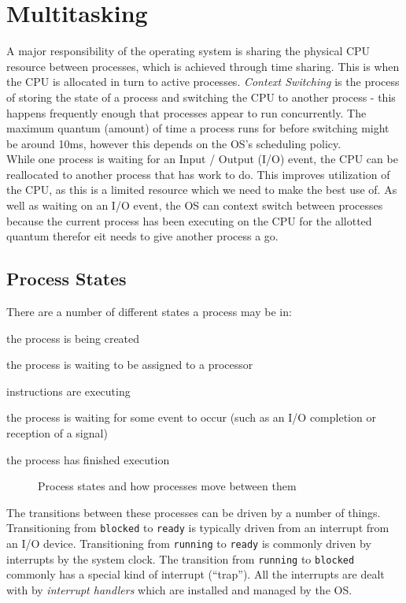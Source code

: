\section{Multitasking}
A major responsibility of the operating system is sharing the physical CPU resource between processes, which is achieved through time sharing. This is when the CPU is allocated in turn to active processes. \textit{Context Switching} is the process of storing the state of a process and switching the CPU to another process - this happens frequently enough that processes appear to run concurrently. The maximum quantum (amount) of time a process runs for before switching might be around 10ms, however this depends on the OS's scheduling policy.  \\

While one process is waiting for an Input / Output (I/O) event, the CPU can be reallocated to another process that has work to do. This improves utilization of the CPU, as this is a limited resource which we need to make the best use of. As well as waiting on an I/O event, the OS can context switch between processes because the current process has been executing on the CPU for the allotted quantum therefor eit needs to give another process a go.

\subsection{Process States}
There are a number of different states a process may be in:
\begin{description}[font=\ttfamily]
    \item[new] the process is being created
    \item[ready] the process is waiting to be assigned to a processor
    \item[running] instructions are executing
    \item[blocked / waiting] the process is waiting for some event to occur (such as an I/O completion or reception of a signal)
    \item[terminated] the process has finished execution 
\end{description}

\begin{figure}[H]
    \centering
    
    \caption{Process states and how processes move between them}
\end{figure}

The transitions between these processes can be driven by a number of things. Transitioning from \verb|blocked| to \verb|ready| is typically driven from an interrupt from an I/O device. Transitioning from \verb|running| to \verb|ready| is commonly driven by interrupts by the system clock. The transition from \verb|running| to \verb|blocked| commonly has a special kind of interrupt (``trap''). All the interrupts are dealt with by \textit{interrupt handlers} which are installed and managed by the OS. \\

